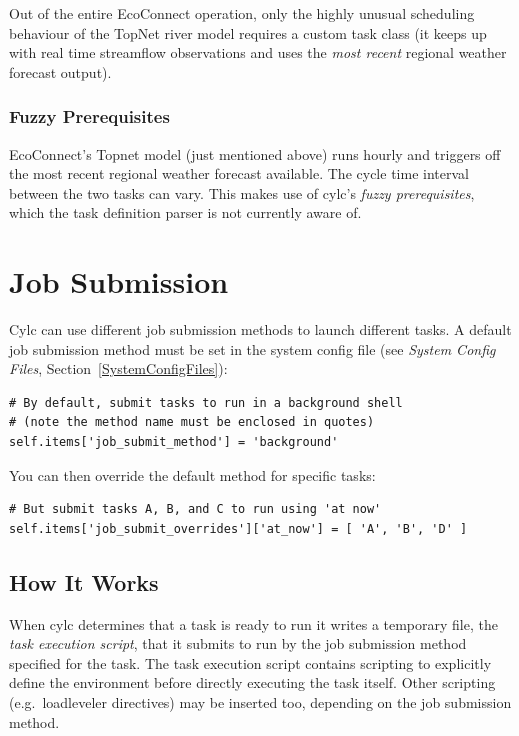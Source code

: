 \documentclass[11pt,a4paper]{article}
\begin{document}
Out of the entire EcoConnect operation, only the highly unusual
scheduling behaviour of the TopNet river model requires a custom task
class (it keeps up with real time streamflow observations and uses
the {\em most recent} regional weather forecast output). 

\subsubsection{Fuzzy Prerequisites}

EcoConnect's Topnet model (just mentioned above) runs hourly and
triggers off the most recent regional weather forecast available.
The cycle time interval between the two tasks can vary. This makes 
use of cylc's {\em fuzzy prerequisites}, which the task definition
parser is not currently aware of.


\pagebreak


\pagebreak
\section{Job Submission}
\label{JobSubmission}

Cylc can use different job submission methods to launch different tasks. 
A default job submission method must be set in the system config file
(see {\em System Config Files}, Section~\ref{SystemConfigFiles}):
 
\lstset{language=Python}

\begin{lstlisting}
# By default, submit tasks to run in a background shell
# (note the method name must be enclosed in quotes)
self.items['job_submit_method'] = 'background'
\end{lstlisting}
 
You can then override the default method for specific tasks:

\begin{lstlisting}
# But submit tasks A, B, and C to run using 'at now'
self.items['job_submit_overrides']['at_now'] = [ 'A', 'B', 'D' ]
\end{lstlisting}

\subsection{How It Works}
\label{HowItWorks}

When cylc determines that a task is ready to run it writes a temporary
file, the {\em task execution script}, that it submits to run by the job
submission method specified for the task. The task execution script
contains scripting to explicitly define the environment before directly
executing the task itself. Other scripting (e.g.\ loadleveler
directives) may be inserted too, depending on the job submission method.
\end{document}
